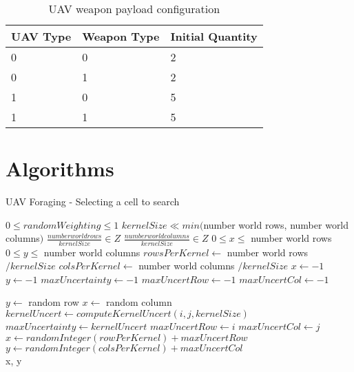 \begin{table}[h]
	\caption{UAV weapon payload configuration}
	\centering
	\label{tab:uavWpnMap}
	\begin{tabular}{|p{1cm}|p{1.5cm}|p{2cm}|}
		\hline
		UAV Type & Weapon Type & Initial Quantity\\ \hline
		0 & 0 & 2 \\
		0 & 1 & 2 \\
		1 & 0 & 5 \\
		1 & 1 & 5 \\
		\hline
	\end{tabular}
\end{table}


\section{Algorithms}
\label{sec:algorithms}

\begin{algorithm}
	\caption{UAV Foraging - Selecting a cell to search}
	\label{alg:forage}
	\begin{algorithmic}[1]
			\Require $ 0\le randomWeighting \le 1$
			\Require $ kernelSize \ll min($number world rows, number world columns$)$
			\Require $ \frac{number world rows}{kernelSize} \in Z$
			\Require $ \frac{number world columns}{kernelSize} \in Z$
			\Ensure $ 0 \le x \le $ number world rows
			\Ensure $ 0 \le y \le $ number world columns
			\State $rowsPerKernel\gets $ number world rows $ / kernelSize$
			\State $colsPerKernel\gets $ number world columns $ / kernelSize$		
			\State $x\gets -1$
			\State $y\gets -1$
			\State $maxUncertainty\gets -1$
			\State $maxUncertRow\gets -1$
			\State $maxUncertCol\gets -1$
			
			
				\State $ y\gets $ random row
				\State $ x\gets $ random column
			\Else
						\State $kernelUncert\gets computeKernelUncert(i,j, kernelSize)$
							\State $maxUncertainty\gets kernelUncert$
							\State $maxUncertRow\gets i$
							\State $maxUncertCol\gets j$	
						\EndIf
					\EndFor
				\EndFor
				\State $x\gets randomInteger(rowPerKernel) + maxUncertRow$			
				\State $y\gets randomInteger(colsPerKernel) + maxUncertCol$
			\EndIf \\
			
			\Return x, y
		\EndFunction
	\end{algorithmic}
\end{algorithm}

